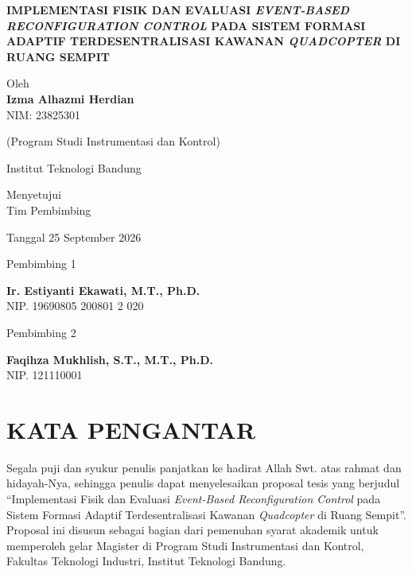 \documentclass[12pt,a4paper]{report}
\begin{document}
\begin{center}
    \textbf{IMPLEMENTASI FISIK DAN EVALUASI \textit{EVENT-BASED RECONFIGURATION CONTROL} PADA SISTEM FORMASI ADAPTIF TERDESENTRALISASI KAWANAN \textit{QUADCOPTER} DI RUANG SEMPIT}

    \vspace{0.8cm}
    Oleh\\
    \textbf{Izma Alhazmi Herdian}\\
    NIM: 23825301

    \vspace{0.8cm}
    (Program Studi Instrumentasi dan Kontrol)

    \vspace{0.8cm}
    Institut Teknologi Bandung

    \vspace{1.5cm}
    Menyetujui\\
    Tim Pembimbing

    \vspace{0.8cm}
    Tanggal 25 September 2026
\end{center}

\vspace{1.2cm}

\noindent
\begin{minipage}[t]{0.49\textwidth}
    \centering
    Pembimbing 1

    \vspace{2.5cm}

    {\bfseries Ir. Estiyanti Ekawati, M.T., Ph.D.}\\
    NIP. 19690805 200801 2 020
\end{minipage}
\hfill
\begin{minipage}[t]{0.49\textwidth}
    \centering
    Pembimbing 2

    \vspace{2.5cm}

    {\bfseries Faqihza Mukhlish, S.T., M.T., Ph.D.}\\
    NIP. 121110001 
\end{minipage}

\chapter*{KATA PENGANTAR}

Segala puji dan syukur penulis panjatkan ke hadirat Allah Swt. atas rahmat dan hidayah-Nya, sehingga penulis dapat menyelesaikan proposal tesis yang berjudul ``Implementasi Fisik dan Evaluasi \textit{Event-Based Reconfiguration Control} pada Sistem Formasi Adaptif Terdesentralisasi Kawanan \textit{Quadcopter} di Ruang Sempit''. Proposal ini disusun sebagai bagian dari pemenuhan syarat akademik untuk memperoleh gelar Magister di Program Studi Instrumentasi dan Kontrol, Fakultas Teknologi Industri, Institut Teknologi Bandung.
\end{document}
